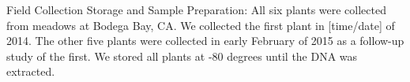 
Field Collection Storage and Sample Preparation:
All six plants were collected from meadows at Bodega Bay, CA. We collected the first plant in [time/date] of 2014. The other five plants were collected in early February of 2015 as a follow-up study of the first. We stored all plants at -80 degrees until the DNA was extracted. 
    

    